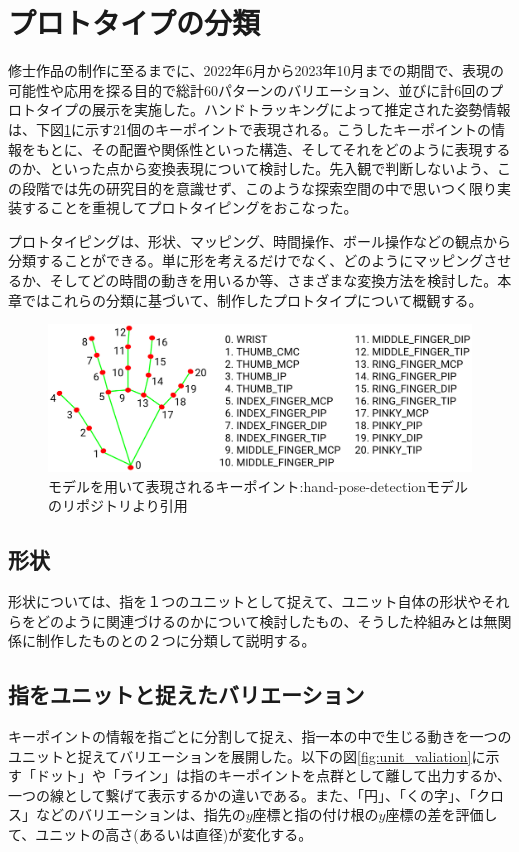 \section{プロトタイプの分類}
修士作品の制作に至るまでに、2022年6月から2023年10月までの期間で、表現の可能性や応用を探る目的で総計60パターンのバリエーション、並びに計6回のプロトタイプの展示を実施した。ハンドトラッキングによって推定された姿勢情報は、下図\ref{fig:keypoints}に示す21個のキーポイントで表現される。こうしたキーポイントの情報をもとに、その配置や関係性といった構造、そしてそれをどのように表現するのか、といった点から変換表現について検討した。先入観で判断しないよう、この段階では先の研究目的を意識せず、このような探索空間の中で思いつく限り実装することを重視してプロトタイピングをおこなった。

プロトタイピングは、形状、マッピング、時間操作、ボール操作などの観点から分類することができる。単に形を考えるだけでなく、どのようにマッピングさせるか、そしてどの時間の動きを用いるか等、さまざまな変換方法を検討した。本章ではこれらの分類に基づいて、制作したプロトタイプについて概観する。

\begin{figure}[H]
  \centering
  \includegraphics[width=15cm]{img/hand_keypoints.png}
  \caption{モデルを用いて表現されるキーポイント:hand-pose-detectionモデルのリポジトリより引用}
  \label{fig:keypoints}
\end{figure}

\subsection{形状}
形状については、指を１つのユニットとして捉えて、ユニット自体の形状やそれらをどのように関連づけるのかについて検討したもの、そうした枠組みとは無関係に制作したものとの２つに分類して説明する。
\subsection*{指をユニットと捉えたバリエーション}
キーポイントの情報を指ごとに分割して捉え、指一本の中で生じる動きを一つのユニットと捉えてバリエーションを展開した。以下の図\ref{fig:unit_valiation}に示す「ドット」や「ライン」は指のキーポイントを点群として離して出力するか、一つの線として繋げて表示するかの違いである。また、「円」、「くの字」、「クロス」などのバリエーションは、指先の\(y\)座標と指の付け根の\(y\)座標の差を評価して、ユニットの高さ(あるいは直径)が変化する。

